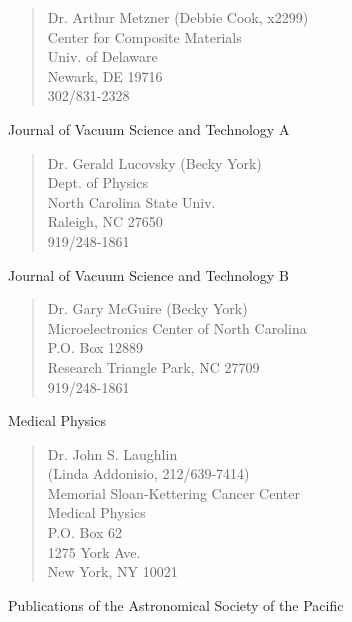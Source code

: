 \begin{verse}
             Dr. Arthur Metzner (Debbie Cook, x2299)\\
             Center for Composite Materials\\
             Univ. of Delaware\\
             Newark, DE  19716\\
             302/831-2328\\
\end{verse}


\noindent      Journal of Vacuum Science and Technology A

\begin{verse}
             Dr. Gerald Lucovsky (Becky York)\\
             Dept. of Physics\\
             North Carolina State Univ.\\
             Raleigh, NC  27650\\
             919/248-1861\\
\end{verse}

\noindent      Journal of Vacuum Science and Technology B

\begin{verse}
             Dr. Gary McGuire (Becky York)\\
             Microelectronics Center of North Carolina\\
             P.O. Box 12889\\
             Research Triangle Park, NC  27709\\
             919/248-1861\\
\end{verse}

\noindent      Medical Physics

\begin{verse}
             Dr. John S. Laughlin\\
             (Linda Addonisio, 212/639-7414)\\
             Memorial Sloan-Kettering Cancer Center\\
             Medical Physics\\
             P.O. Box 62\\
             1275 York Ave.\\
             New York, NY  10021\\
\end{verse}

\noindent      Publications of the Astronomical Society of the Pacific

